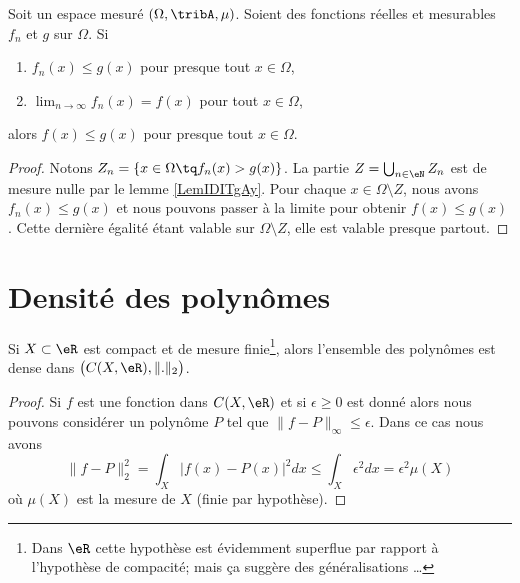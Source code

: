 

\begin{proposition}	\label{PROPooDOTQooWaMBrO}
	Soit un espace mesuré \( (\Omega,\tribA,\mu)\). Soient des fonctions réelles et mesurables \( f_n\) et \( g\) sur \( \Omega\). Si
	\begin{enumerate}
		\item
		      \( f_n(x)\leq g(x)\) pour presque tout \( x\in\Omega\),
		\item
		      \( \lim_{n\to\infty}f_n(x)=f(x)\) pour tout \( x\in \Omega\),
	\end{enumerate}
	alors \( f(x)\leq g(x)\) pour presque tout \( x\in \Omega\).
\end{proposition}

\begin{proof}
	Notons \( Z_n=\{ x\in \Omega\tq f_n(x)>g(x) \}\). La partie \( Z=\bigcup_{n\in \eN}Z_n\) est de mesure nulle par le lemme \ref{LemIDITgAy}. Pour chaque \( x\in \Omega\setminus Z\), nous avons \( f_n(x)\leq g(x)\) et nous pouvons passer à la limite pour obtenir \( f(x)\leq g(x)\). Cette dernière égalité étant valable sur \( \Omega\setminus Z\), elle est valable presque partout.
\end{proof}


\section{Densité des polynômes}

\begin{corollary}   \label{CorRSczQD}
	Si \( X\subset \eR\) est compact et de mesure finie\footnote{Dans \( \eR\) cette hypothèse est évidemment superflue par rapport à l'hypothèse de compacité; mais ça suggère des généralisations \ldots}, alors l'ensemble des polynômes est dense dans \( \big( C(X,\eR),\| . \|_2 \big)\).
\end{corollary}

\begin{proof}
	Si \( f\) est une fonction dans \( C(X,\eR)\) et si \( \epsilon\geq 0\) est donné alors nous pouvons considérer un polynôme \( P\) tel que \( \| f-P \|_{\infty}\leq \epsilon\). Dans ce cas nous avons
	\begin{equation}
		\| f-P \|_2^2=\int_X| f(x)-P(x) |^2dx\leq \int_X\epsilon^2dx=\epsilon^2\mu(X)
	\end{equation}
	où \( \mu(X)\) est la mesure de \( X\) (finie par hypothèse).
\end{proof}

